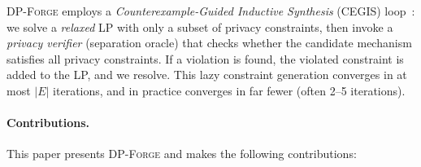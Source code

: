 \documentclass[11pt,a4paper]{article}
\newcommand{\dpforge}{\textsc{DP-Forge}}
\begin{document}
\dpforge{} employs a \emph{Counterexample-Guided Inductive Synthesis} (CEGIS)
loop~\cite{solar2006combinatorial,narodytska2019learning}: we solve a \emph{relaxed}
LP with only a subset of privacy constraints, then invoke a \emph{privacy verifier}
(separation oracle) that checks whether the candidate mechanism satisfies all
privacy constraints.  If a violation is found, the violated constraint is added
to the LP, and we resolve.  This lazy constraint generation converges in at most
$|E|$ iterations, and in practice converges in far fewer (often 2--5 iterations).

\paragraph{Contributions.}
This paper presents \dpforge{} and makes the following contributions:
\end{document}
